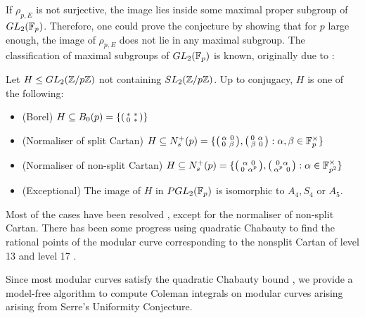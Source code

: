 If $\rho_{p,E}$ is not surjective, the image lies inside some maximal proper subgroup of $GL_2(\mathbb{F}_p)$. Therefore, one could prove the conjecture by showing that for $p$ large enough, the image of $\rho_{p,E}$ does not lie in any maximal subgroup. The classification of maximal subgroups of $GL_2(\mathbb{F}_p)$ is known, originally due to \cite{dickson}:

\begin{theorem}
    Let $H \leq GL_2(\mathbb{Z}/p\mathbb{Z})$ not containing $SL_2(\mathbb{Z}/p\mathbb{Z})$. Up to conjugacy, $H$ is one of the following:
    \begin{itemize}
        \item (Borel) $H \subseteq B_0(p) = \{ \begin{psmallmatrix} \ast \ \ast \\ 0 \ \ast \end{psmallmatrix} \}$ 
        \item (Normaliser of split Cartan) $H \subseteq N_s^+(p) = \{ \begin{psmallmatrix} \alpha \ 0 \\ 0 \ \beta \end{psmallmatrix}, \begin{psmallmatrix} 0 \ \alpha \\ \beta \ 0 \end{psmallmatrix}: \alpha,\beta \in \mathbb{F}_p^\times \}$ 
        \item (Normaliser of non-split Cartan) $H \subseteq N_s^+(p) = \{ \begin{psmallmatrix} \alpha \ 0 \\ 0 \ \alpha^p \end{psmallmatrix}, \begin{psmallmatrix} 0 \ \alpha \\ \alpha^p \ 0 \end{psmallmatrix}: \alpha \in \mathbb{F}_{p^2}^\times \}$ 
        \item (Exceptional) The image of $H$ in $PGL_2(\mathbb{F}_p)$ is isomorphic to $A_4,S_4$ or $A_5$.
    \end{itemize}
\end{theorem}

Most of the cases have been resolved \cite{borel,BP1,BP2,serre72}, except for the normaliser of non-split Cartan. There has been some progress using quadratic Chabauty to find the rational points of the modular curve corresponding to the nonsplit Cartan of level 13 \cite{cursed-curve} and level 17 \cite{BDMTV}.

Since most modular curves satisfy the quadratic Chabauty bound \cite{Siksek}, we provide a model-free algorithm to compute Coleman integrals on modular curves arising  arising from Serre's Uniformity Conjecture.
